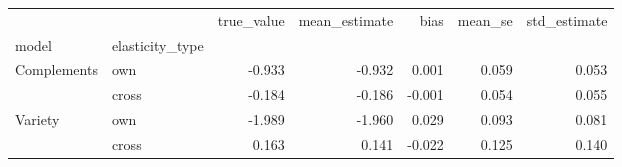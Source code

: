 \begin{tabular}{llrrrrr}
\toprule
 &  & true_value & mean_estimate & bias & mean_se & std_estimate \\
model & elasticity_type &  &  &  &  &  \\
\midrule
\multirow[t]{2}{*}{Complements} & own & -0.933 & -0.932 & 0.001 & 0.059 & 0.053 \\
 & cross & -0.184 & -0.186 & -0.001 & 0.054 & 0.055 \\
\cline{1-7}
\multirow[t]{2}{*}{Variety} & own & -1.989 & -1.960 & 0.029 & 0.093 & 0.081 \\
 & cross & 0.163 & 0.141 & -0.022 & 0.125 & 0.140 \\
\cline{1-7}
\bottomrule
\end{tabular}
